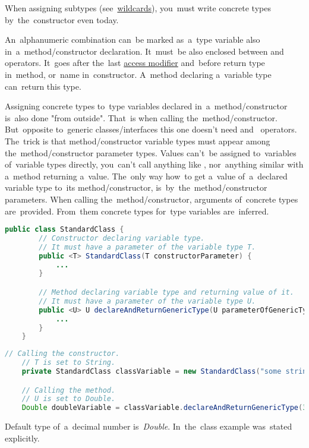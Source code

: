 \note When assigning subtypes (see~\hyperref[javagenericswildcards]{wildcards}), you~must write concrete types by~the~constructor even today.

\label{javagenericmethod}
An~alphanumeric combination can~be marked as~a~type variable also in~a~method/constructor declaration.
It~must~be also enclosed between  \mbox{and } operators.
It~goes after the~last \hyperref[javaaccessmodifiers]{access modifier} and~before return type in~method, or~name in~constructor.
A~method declaring a~variable type can~return this type.

Assigning concrete types to~type variables declared in~a~method/constructor is~also done "from outside".
That~is when calling the~method/constructor.
But~opposite to~generic classes/interfaces this one doesn't need  \mbox{and } operators.
The~trick is that method/constructor variable types must appear among the~method/constructor parameter types.
Values can't~be assigned to~variables of~variable types directly, you~can't call anything like , nor~anything similar with a~method returning a~value.
The~only way how~to get a~value of~a~declared variable type to~its method/constructor, is~by~the~method/constructor parameters.
When calling the~method/constructor, arguments of~concrete types are~provided.
From~them concrete types for~type variables are~inferred.

\begin{lstlisting}[language=Java, title={Class with constructor and method delcaring variable types}]
    public class StandardClass {
        // Constructor declaring variable type.
        // It must have a parameter of the variable type T.
        public <T> StandardClass(T constructorParameter) {
            ...
        }

        // Method declaring variable type and returning value of it.
        // It must have a parameter of the variable type U.
        public <U> U declareAndReturnGenericType(U parameterOfGenericType) {
            ...
        }
    }
\end{lstlisting}
\newpage

\begin{lstlisting}[language=Java, title={Concrete types assignment}]
    // Calling the constructor.
    // T is set to String.
    private StandardClass classVariable = new StandardClass("some string");

    // Calling the method.
    // U is set to Double.
    Double doubleVariable = classVariable.declareAndReturnGenericType(3.14);
\end{lstlisting}
\notenonl Default type of~a~decimal number \mbox{is \textit{Double}}.
In~the~class example  was~stated explicitly.

